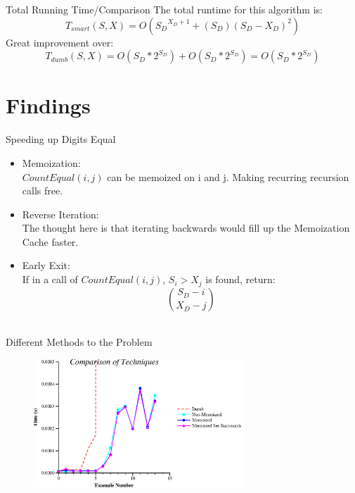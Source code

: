 \documentclass[10pt]{beamer}
\begin{document}
\begin{frame}{Total Running Time/Comparison}
  The total runtime for this algorithm is:
  \begin{equation*}
    T_{smart}(S, X) = O({S_{D}}^{X_{D} + 1} + (S_{D})(S_{D} - X_D)^{2})
  \end{equation*}
  Great improvement over:
  \begin{equation*}
    T_{dumb}(S, X) = O(S_{D}*2^{S_{D}}) + O(S_{D}*2^{S_{D}}) = O(S_{D}*2^{S_{D}})
  \end{equation*}
\end{frame}

\section{Findings}

\begin{frame}{Speeding up Digits Equal}
  \begin{itemize}
    \item Memoization: \\
      $CountEqual(i, j)$ can be memoized on i and j.
      Making recurring recursion calls free.
    \item Reverse Iteration: \\
      The thought here is that iterating backwards would fill up the Memoization Cache faster.
    \item Early Exit: \\
      If in a call of $CountEqual(i, j)$, $S_{i} > X_{j}$ is found, return:\\
      \begin{equation*}
        \binom{S_{D} - i}{X_{D} - j}
      \end{equation*}\\
  \end{itemize}
\end{frame}


\begin{frame}{Different Methods to the Problem}
  \begin{figure}[ht!]
    \centering
    \includegraphics[width=0.7\textwidth]{../figures/comparison.ps}
  \end{figure}
\end{frame}
\end{document}
